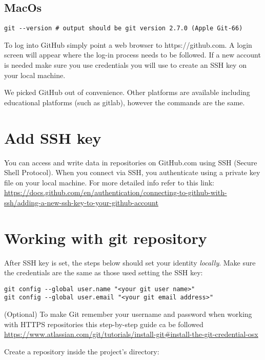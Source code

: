 \documentclass[11pt]{article}
\newcommand{\nextdiv}{\vspace{2mm}\noindent}
\begin{document}
\subsection*{MacOs}

\begin{lstlisting}
git --version # output should be git version 2.7.0 (Apple Git-66)
\end{lstlisting}

\nextdiv
To log into GitHub simply point a web browser to https://github.com. A login screen will appear where the log-in process needs to be followed. If a new account is needed make sure you use credentials you will use to create an SSH key on your local machine. 

\nextdiv
We picked GitHub out of convenience. Other platforms are available including educational platforms (such as gitlab), however the commands are the same.

\section*{Add SSH key}

You can access and write data in repositories on GitHub.com using SSH (Secure Shell Protocol). When you connect via SSH, you authenticate using a private key file on your local machine. For more detailed info refer to this link: \url{https://docs.github.com/en/authentication/connecting-to-github-with-ssh/adding-a-new-ssh-key-to-your-github-account}

\section*{Working with git repository}

After SSH key is set, the steps below should set your identity \textit{locally}. Make sure the credentials are the same as those used setting the SSH key:

\begin{lstlisting}
git config --global user.name "<your git user name>"
git config --global user.email "<your git email address>"
\end{lstlisting}

\nextdiv
(Optional) To make Git remember your username and password when working with HTTPS repositories this step-by-step guide ca be followed \url{https://www.atlassian.com/git/tutorials/install-git#install-the-git-credential-osx}


\nextdiv
Create a repository inside the project's directory:
\end{document}
